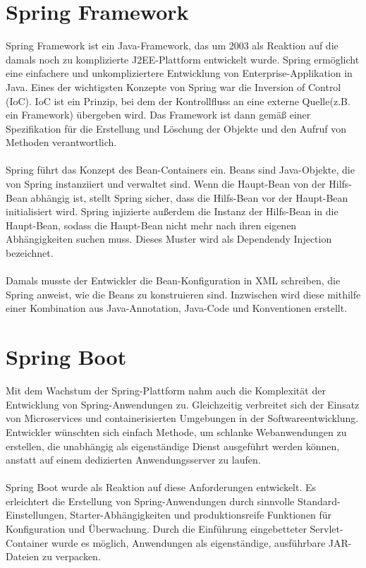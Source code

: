 \documentclass[a4paper,12pt]{scrreprt}
\begin{document}
	\section{Spring Framework}
	Spring Framework ist ein Java-Framework, das um 2003 als Reaktion auf die damals noch zu komplizierte J2EE-Plattform entwickelt wurde. Spring ermöglicht eine einfachere und unkompliziertere Entwicklung von Enterprise-Applikation in Java. Eines der wichtigsten Konzepte von Spring war die Inversion of Control (IoC).
	IoC ist ein Prinzip, bei dem der Kontrollfluss an eine externe Quelle(z.B. ein Framework) übergeben wird. Das Framework ist dann gemäß einer Spezifikation für die Erstellung und Löschung der Objekte und den Aufruf von Methoden verantwortlich. \\ \\ Spring führt das Konzept des Bean-Containers ein. Beans sind Java-Objekte, die von Spring instanziiert und verwaltet sind. Wenn die Haupt-Bean von der Hilfs-Bean abhängig ist, stellt Spring sicher, dass die Hilfs-Bean vor der Haupt-Bean initialisiert wird. Spring injizierte außerdem die Instanz der Hilfs-Bean in die Haupt-Bean, sodass die Haupt-Bean nicht mehr nach ihren eigenen Abhängigkeiten suchen muss. Dieses Muster wird als Dependendy Injection bezeichnet.\\ \\
	Damals musste der Entwickler die Bean-Konfiguration in XML schreiben, die Spring anweist, wie die Beans zu konstruieren sind. Inzwischen wird diese mithilfe einer Kombination aus Java-Annotation, Java-Code und Konventionen erstellt.
	\section{Spring Boot}
	Mit dem Wachstum der Spring-Plattform nahm auch die Komplexität der Entwicklung von Spring-Anwendungen zu. Gleichzeitig verbreitet sich der Einsatz von Microservices und containerisierten Umgebungen in der Softwareentwicklung. Entwickler wünschten sich einfach Methode, um schlanke Webanwendungen zu erstellen, die unabhängig als eigenständige Dienst ausgeführt werden können, anstatt auf einem dedizierten Anwendungsserver zu laufen.\\ \\
	Spring Boot wurde als Reaktion auf diese Anforderungen entwickelt. Es erleichtert die Erstellung von Spring-Anwendungen durch sinnvolle Standard-Einstellungen, Starter-Abhängigkeiten und produktionsreife Funktionen für Konfiguration und Überwachung. Durch die Einführung eingebetteter Servlet-Container wurde es möglich, Anwendungen als eigenständige, ausführbare JAR-Dateien zu verpacken. 
\end{document}
